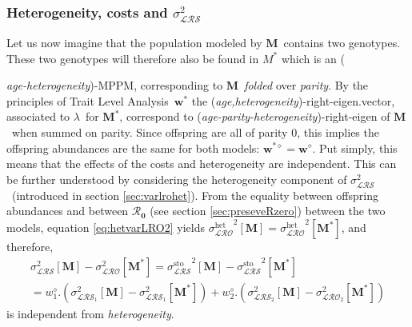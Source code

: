 \documentclass[10pt,a4paper]{article}
\newcommand{\M}{$\mathbf{M}$}
\newcommand{\lam}{$\lambda$}
\newcommand{\Rzero}{$\boldsymbol{\mathcal{R}_{0}}$  }
\newcommand{\PCoR}{\emph{individual} costs}
\newcommand{\TLA}{Trait Level Analysis}
\newcommand{\vLRO}{$\sigma_{\mathrm{\mathcal{LRS}}}^2$}
\begin{document}
\subsubsection*{Heterogeneity, costs and \vLRO}
Let us now imagine that the population modeled by \M\ contains two genotypes. These two genotypes will therefore also be found in $M^{*}$ which is an ({\emph{age-heterogeneity})-MPPM, corresponding to \M\ \emph{folded} over \emph{parity}. By the principles of \TLA\, $\bm{w^{*}}$ the (\emph{age,heterogeneity})-right-eigen.vector, associated to \lam\ for $\mathbf{M^{*}}$, correspond to (\emph{age-parity-heterogeneity})-right-eigen of \M\ when summed on parity. Since offspring are all of parity 0, this implies the offspring abundances are the same for both models: $\bm{w^{*\diamond}}=\bm{w^{\diamond}}$. Put simply, this means that the effects of the costs and heterogeneity are independent. This can be further understood by considering the heterogeneity component of \vLRO\ (introduced in section \ref{sec:varlrohet}). From the equality between offspring abundances and between \Rzero (see section \ref{sec:preseveRzero}) between the two models, equation \ref{eq:hetvarLRO2} yields ${\sigma_{\mathcal{LRO}}^{\mathrm{het}}}^{2}\left[ \mathbf{M}\right] = {\sigma_{\mathcal{LRO}}^{\mathrm{het}}}^{2}\left[ \mathbf{M^{*}}\right]$, and therefore,
\begin{multline*}
\sigma^{2}_{\mathcal{LRS}}\left[ \mathbf{M}\right]-\sigma^{2}_{\mathcal{LRO}}\left[ \mathbf{M^{*}}\right] ={\sigma_{\mathcal{LRS}}^{\mathrm{sto}}}^{2}\left[ \mathbf{M}\right] - {\sigma_{\mathcal{LRS}}^{\mathrm{sto}}}^{2}\left[ \mathbf{M^{*}}\right] \\
= w^{\diamond}_{1}.(\sigma^{2}_{\mathcal{LRS}_1}\left[ \mathbf{M}\right]-\sigma^{2}_{\mathcal{LRS}_1}\left[ \mathbf{M^{*}}\right]  )  +w^{\diamond}_{2}.(\sigma^{2}_{\mathcal{LRS}_2}\left[ \mathbf{M}\right]-\sigma^{2}_{\mathcal{LRO}_2}\left[ \mathbf{M^{*}}\right])
\end{multline*}
is independent from \emph{heterogeneity}.

}
\end{document}

